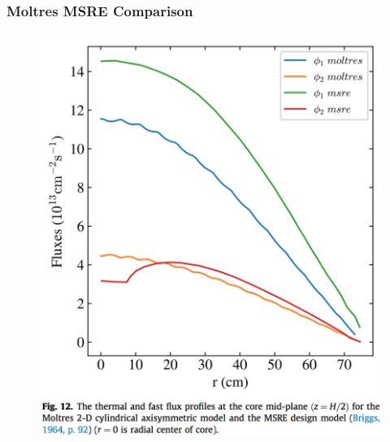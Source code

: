 \begin{frame}
        \frametitle{Moltres MSRE Comparison}
  \begin{figure}
   \vspace{-0.05in}
   \includegraphics[height=0.85\textheight]{./images/moltres-axisym-flux.png}
    \end{figure}
\end{frame}


